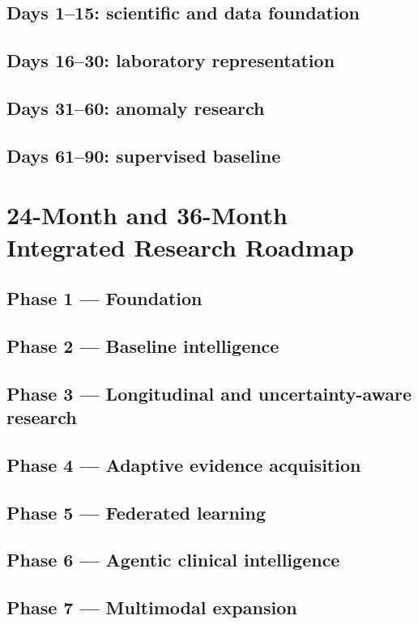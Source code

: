 \documentclass[11pt,journal,onecolumn,draftclsnofoot]{IEEEtran}
\begin{document}
\subsection{Days 1--15: scientific and data foundation}
\subsection{Days 16--30: laboratory representation}
\subsection{Days 31--60: anomaly research}
\subsection{Days 61--90: supervised baseline}

\section{24-Month and 36-Month Integrated Research Roadmap}
\subsection{Phase 1 --- Foundation}
\subsection{Phase 2 --- Baseline intelligence}
\subsection{Phase 3 --- Longitudinal and uncertainty-aware research}
\subsection{Phase 4 --- Adaptive evidence acquisition}
\subsection{Phase 5 --- Federated learning}
\subsection{Phase 6 --- Agentic clinical intelligence}
\subsection{Phase 7 --- Multimodal expansion}
\end{document}
